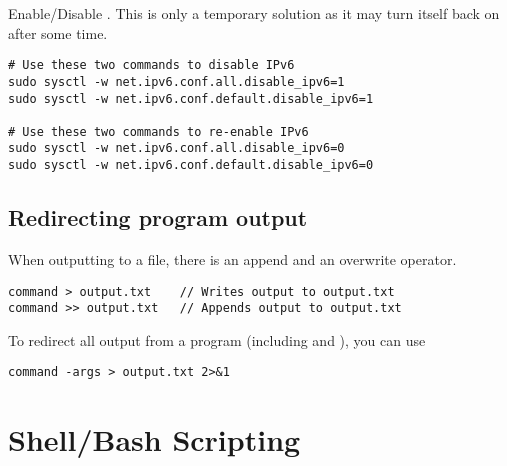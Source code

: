 Enable/Disable . This is only a temporary solution as it may turn itself back on after some time.
\begin{lstlisting}
# Use these two commands to disable IPv6
sudo sysctl -w net.ipv6.conf.all.disable_ipv6=1
sudo sysctl -w net.ipv6.conf.default.disable_ipv6=1

# Use these two commands to re-enable IPv6
sudo sysctl -w net.ipv6.conf.all.disable_ipv6=0
sudo sysctl -w net.ipv6.conf.default.disable_ipv6=0
\end{lstlisting}







\subsection{Redirecting program output}

When outputting to a file, there is an append and an overwrite operator.
\begin{lstlisting}
command > output.txt    // Writes output to output.txt
command >> output.txt   // Appends output to output.txt
\end{lstlisting}
To redirect all output from a program (including  and ), you can use 
\begin{lstlisting}
command -args > output.txt 2>&1
\end{lstlisting}






\section{Shell/Bash Scripting}

\lstset{language=Bash, style=shellstyle}


